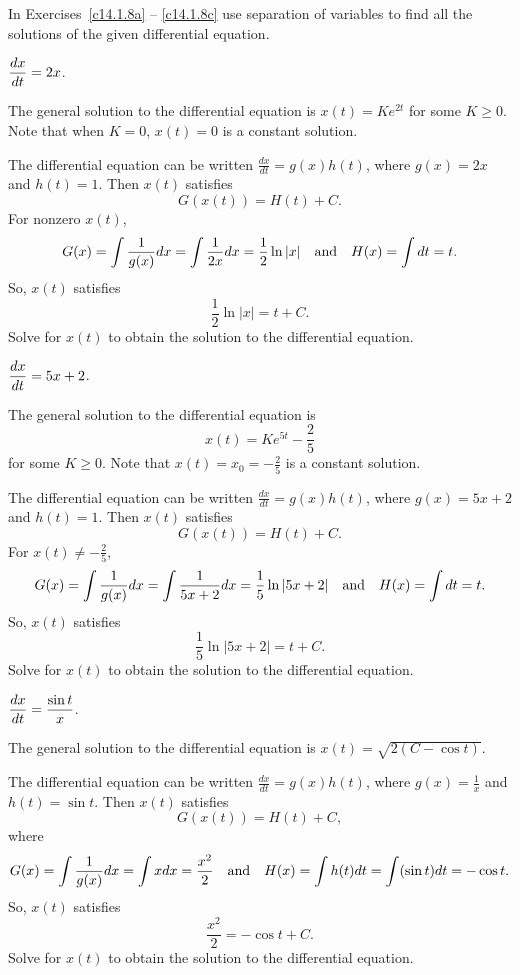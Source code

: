 \documentclass{ximera}
\begin{document}
\noindent In Exercises~\ref{c14.1.8a} -- \ref{c14.1.8c} use separation 
of variables to find all the solutions of the given differential equation.
\begin{exercise}  \label{c14.1.8a}
$\displaystyle \frac{dx}{dt} = 2x$.

\begin{solution}
\ans The general solution to the differential equation is
$x(t) = Ke^{2t}$ for some $K \geq 0$.  Note that when $K = 0$, $x(t) = 0$ is
a constant solution.


\soln The differential equation can be written $\frac{dx}{dt} = g(x)h(t)$,
where $g(x) = 2x$ and $h(t) = 1$.  Then $x(t)$ satisfies
\[
G(x(t)) = H(t) + C.
\]
For nonzero $x(t)$,
\[
G(x) = \int\frac{1}{g(x)}dx = \int\frac{1}{2x}dx = \frac{1}{2}\ln|x|
\quad\mbox{and}\quad
H(x) = \int dt = t.
\]
So, $x(t)$ satisfies
\[
\frac{1}{2}\ln|x| = t + C.
\]
Solve for $x(t)$ to obtain the solution to the differential equation.


\end{solution}
\end{exercise}
\begin{exercise}  \label{c14.1.8b}
$\displaystyle \frac{dx}{dt} = 5x+2$.

\begin{solution}
\ans The general solution to the differential equation is 
\[
x(t) = Ke^{5t} - \frac{2}{5}
\]
for some $K \geq 0$.  Note that $x(t) = x_0 = -\frac{2}{5}$ is a constant
solution.

\soln The differential equation can be written $\frac{dx}{dt} = g(x)h(t)$,
where $g(x) = 5x + 2$ and $h(t) = 1$.  Then $x(t)$ satisfies
\[
G(x(t)) = H(t) + C.
\]
For $x(t) \neq -\frac{2}{5}$,
\[
G(x) = \int\frac{1}{g(x)}dx = \int\frac{1}{5x + 2}dx = \frac{1}{5}\ln|5x + 2|
\quad\mbox{and}\quad
H(x) = \int dt = t.
\]
So, $x(t)$ satisfies
\[
\frac{1}{5}\ln|5x + 2| = t + C.
\]
Solve for $x(t)$ to obtain the solution to the differential equation.


\end{solution}
\end{exercise}
\begin{exercise}  \label{c14.1.8c}
$\displaystyle \frac{dx}{dt} = \frac{\sin t}{x}$.

\begin{solution}
\ans The general solution to the differential equation is
$x(t) = \sqrt{2(C - \cos t)}$.

\soln The differential equation can be written $\frac{dx}{dt} = g(x)h(t)$,
where $g(x) = \frac{1}{x}$ and $h(t) = \sin t$.  Then $x(t)$ satisfies
\[
G(x(t)) = H(t) + C,
\]
where
\[
G(x) = \int\frac{1}{g(x)}dx = \int xdx = \frac{x^2}{2}
\quad\mbox{and}\quad
H(x) = \int h(t)dt = \int(\sin t)dt = -\cos t.
\]
So, $x(t)$ satisfies
\[
\frac{x^2}{2} = -\cos t + C.
\]
Solve for $x(t)$ to obtain the solution to the differential equation.

\end{solution}
\end{exercise}
\end{document}
